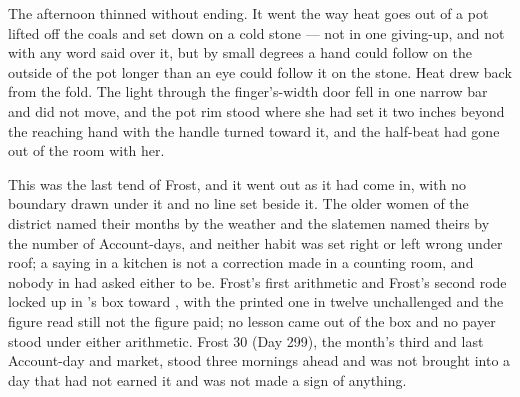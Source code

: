 The afternoon thinned without ending. It went the way heat goes out of a pot lifted off the coals and set down on a cold stone --- not in one giving-up, and not with any word said over it, but by small degrees a hand could follow on the outside of the pot longer than an eye could follow it on the stone. Heat drew back from the fold. The light through the finger's-width door fell in one narrow bar and did not move, and the pot rim stood where she had set it two inches beyond the reaching hand with the handle turned toward it, and the half-beat had gone out of the room with her.

This was the last tend of Frost, and it went out as it had come in, with no boundary drawn under it and no line set beside it. The older women of the district named their months by the weather and the slatemen named theirs by the number of Account-days, and neither habit was set right or left wrong under  roof; a saying in a kitchen is not a correction made in a counting room, and nobody in  had asked either to be. Frost's first arithmetic and Frost's second rode locked up  in 's box toward , with the printed one in twelve unchallenged and the figure read still not the figure paid; no lesson came out of the box and no payer stood under either arithmetic. Frost 30 (Day 299), the month's third and last Account-day and market, stood three mornings ahead and was not brought into a day that had not earned it and was not made a sign of anything.

